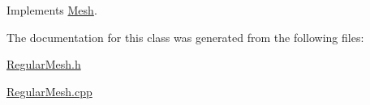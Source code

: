 Implements \mbox{\hyperlink{class_mesh_a4369b541f608d9a812da80f4d7b13661}{Mesh}}.



The documentation for this class was generated from the following files\+:\begin{DoxyCompactItemize}
\item 
\mbox{\hyperlink{_regular_mesh_8h}{Regular\+Mesh.\+h}}\item 
\mbox{\hyperlink{_regular_mesh_8cpp}{Regular\+Mesh.\+cpp}}\end{DoxyCompactItemize}
